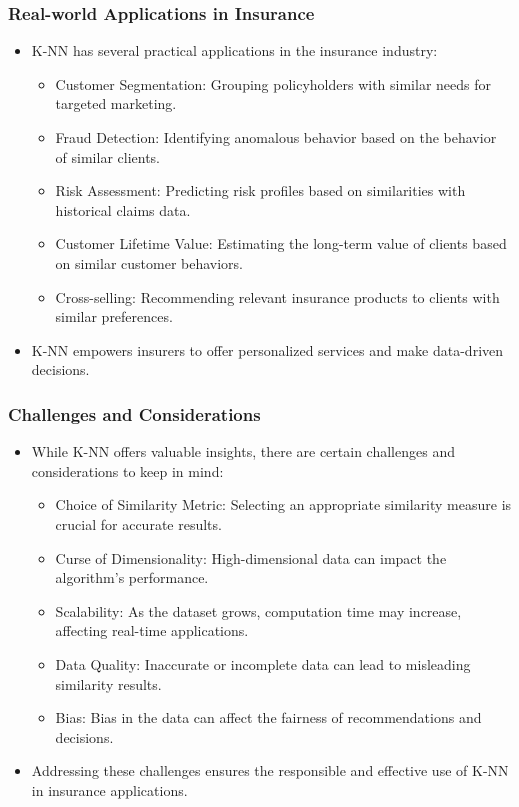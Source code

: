 \begin{frame}[fragile]\frametitle{Real-world Applications in Insurance}
\begin{itemize}
\item K-NN has several practical applications in the insurance industry:
\begin{itemize}
\item Customer Segmentation: Grouping policyholders with similar needs for targeted marketing.
\item Fraud Detection: Identifying anomalous behavior based on the behavior of similar clients.
\item Risk Assessment: Predicting risk profiles based on similarities with historical claims data.
\item Customer Lifetime Value: Estimating the long-term value of clients based on similar customer behaviors.
\item Cross-selling: Recommending relevant insurance products to clients with similar preferences.
\end{itemize}
\item K-NN empowers insurers to offer personalized services and make data-driven decisions.
\end{itemize}
\end{frame}

\begin{frame}[fragile]\frametitle{Challenges and Considerations}
\begin{itemize}
\item While K-NN offers valuable insights, there are certain challenges and considerations to keep in mind:
\begin{itemize}
\item Choice of Similarity Metric: Selecting an appropriate similarity measure is crucial for accurate results.
\item Curse of Dimensionality: High-dimensional data can impact the algorithm's performance.
\item Scalability: As the dataset grows, computation time may increase, affecting real-time applications.
\item Data Quality: Inaccurate or incomplete data can lead to misleading similarity results.
\item Bias: Bias in the data can affect the fairness of recommendations and decisions.
\end{itemize}
\item Addressing these challenges ensures the responsible and effective use of K-NN in insurance applications.
\end{itemize}
\end{frame}

